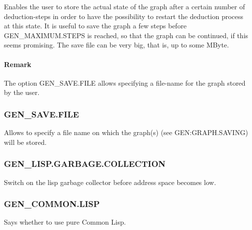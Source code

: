 Enables the user to store the actual state of the graph after a certain 
number of deduction-steps in order to have the possibility to restart the 
deduction process at this state. It is useful to save the graph a few steps 
before GEN\_MAXIMUM.STEPS is reached, so that the graph can be continued, 
if this seems promising. The save file can be very big, that is, up to some
MByte.

\PO
{}

\paragraph{Remark} The option GEN\_SAVE.FILE allows specifying a file-name for the 
graph  stored by the user.

\subsubsection{GEN\_SAVE.FILE}
  

Allows to specify a file name on which the graph(s) (see 
GEN:GRAPH.SAVING) will be stored. 

\pagebreak
\PO
{}


\subsubsection{GEN\_LISP.GARBAGE.COLLECTION}
  
    Switch on the lisp garbage collector before address space becomes low.

\PO

\subsubsection{GEN\_COMMON.LISP}
  
    Says whether to use pure Common Lisp.

\PO

